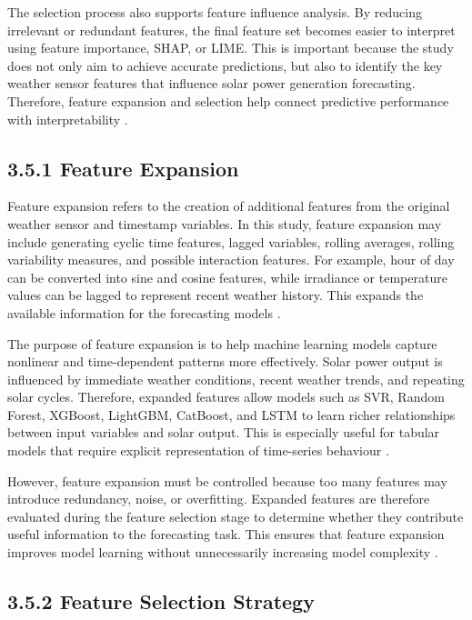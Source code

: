The selection process also supports feature influence analysis. By reducing irrelevant or redundant features, the final feature set becomes easier to interpret using feature importance, SHAP, or LIME. This is important because the study does not only aim to achieve accurate predictions, but also to identify the key weather sensor features that influence solar power generation forecasting. Therefore, feature expansion and selection help connect predictive performance with interpretability \parencite{Bakht2025, JnanaVarshitha2025, Ma2025}.

\subsection{3.5.1 Feature Expansion}

Feature expansion refers to the creation of additional features from the original weather sensor and timestamp variables. In this study, feature expansion may include generating cyclic time features, lagged variables, rolling averages, rolling variability measures, and possible interaction features. For example, hour of day can be converted into sine and cosine features, while irradiance or temperature values can be lagged to represent recent weather history. This expands the available information for the forecasting models \parencite{TsaiLo2025, JnanaVarshitha2025, Eren2025}.

The purpose of feature expansion is to help machine learning models capture nonlinear and time-dependent patterns more effectively. Solar power output is influenced by immediate weather conditions, recent weather trends, and repeating solar cycles. Therefore, expanded features allow models such as SVR, Random Forest, XGBoost, LightGBM, CatBoost, and LSTM to learn richer relationships between input variables and solar output. This is especially useful for tabular models that require explicit representation of time-series behaviour \parencite{Bakht2025, Alhassan2025, CarvalhoJunior2025}.

However, feature expansion must be controlled because too many features may introduce redundancy, noise, or overfitting. Expanded features are therefore evaluated during the feature selection stage to determine whether they contribute useful information to the forecasting task. This ensures that feature expansion improves model learning without unnecessarily increasing model complexity \parencite{Duvuru2026, ArellanosTafur2025, Pongphaw2025}.

\subsection{3.5.2 Feature Selection Strategy}

